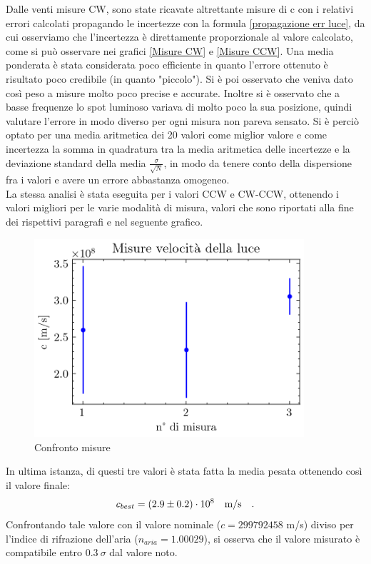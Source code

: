 \documentclass[openright]{article}
\begin{document}
    Dalle venti misure CW, sono state ricavate altrettante misure di c con i relativi errori calcolati propagando le incertezze con la formula \ref{propagazione err luce}, da cui osserviamo che l'incertezza è direttamente proporzionale al valore calcolato, come si può osservare nei grafici \ref{Misure CW} e \ref{Misure CCW}. Una media ponderata è stata considerata poco efficiente in quanto l'errore ottenuto è risultato poco credibile (in quanto "piccolo"). Si è poi osservato che veniva dato così peso a misure molto poco precise e accurate. Inoltre si è osservato che a basse frequenze lo spot luminoso variava di molto poco la sua posizione, quindi valutare l'errore in modo diverso per ogni misura non pareva sensato.
    Si è perciò optato per una media aritmetica dei 20 valori come miglior valore e come incertezza la somma in quadratura tra la media aritmetica delle incertezze e la deviazione standard della media $\frac{\sigma}{\sqrt{N}}$, in modo da tenere conto della dispersione fra i valori e avere un errore abbastanza omogeneo. \\

    La stessa analisi è stata eseguita per i valori CCW e CW-CCW, ottenendo i valori migliori per le varie modalità di misura, valori che sono riportati alla fine dei rispettivi paragrafi e nel seguente grafico. 
    
    \begin{figure}[H]
        \centering
        \includegraphics[width=10cm]{../images/results.png}
        \caption{Confronto misure}
    \end{figure}

    In ultima istanza, di questi tre valori  è stata fatta la media pesata ottenendo così il valore finale: 
    \[ c_{best} = (2.9 \pm 0.2)\cdot10^8 \qq {m/s}. \]
    Confrontando tale valore con il valore nominale ($ c = 299 792 458$ m/s) diviso per l'indice di rifrazione dell'aria ($ n_{aria} = 1.00029$), si osserva che il valore misurato è compatibile entro $0.3 ~\sigma$ dal valore noto. 
    
\end{document}
